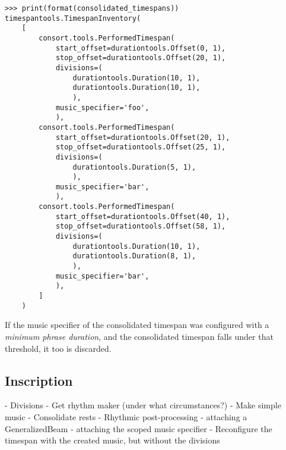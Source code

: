 \begin{abjadbookoutput}
\begin{singlespacing}
\vspace{-0.5\baselineskip}
\begin{lstlisting}
>>> print(format(consolidated_timespans))
timespantools.TimespanInventory(
    [
        consort.tools.PerformedTimespan(
            start_offset=durationtools.Offset(0, 1),
            stop_offset=durationtools.Offset(20, 1),
            divisions=(
                durationtools.Duration(10, 1),
                durationtools.Duration(10, 1),
                ),
            music_specifier='foo',
            ),
        consort.tools.PerformedTimespan(
            start_offset=durationtools.Offset(20, 1),
            stop_offset=durationtools.Offset(25, 1),
            divisions=(
                durationtools.Duration(5, 1),
                ),
            music_specifier='bar',
            ),
        consort.tools.PerformedTimespan(
            start_offset=durationtools.Offset(40, 1),
            stop_offset=durationtools.Offset(58, 1),
            divisions=(
                durationtools.Duration(10, 1),
                durationtools.Duration(8, 1),
                ),
            music_specifier='bar',
            ),
        ]
    )
\end{lstlisting}
\end{singlespacing}
\end{abjadbookoutput}

\noindent If the music specifier of the consolidated timespan was configured
with a \emph{minimum phrase duration}, and the consolidated timespan falls
under that threshold, it too is discarded.

\subsection{Inscription}
\label{ssec:inscription}

\begin{markdown}
-   Divisions
-   Get rhythm maker (under what circumstances?)
-   Make simple music
-   Consolidate rests
-   Rhythmic post-processing
    -   attaching a GeneralizedBeam
    -   attaching the scoped music specifier
-   Reconfigure the timespan with the created music, but without the divisions
\end{markdown}

\begin{comment}
<abjad>
parseable = r'''
\new Voice {
    {
        { \time 4/4 r4 c4 }
        { \times 2/3 { c4 r8 } r4 }
        { \time 4/4 r4 c4. r8 }
        { r4 \break }
        { \time 3/4 r4 }
        { c8 c4. }
        \times 2/3 { \time 2/4 r4 c4 c4 }
        { \time 4/4 c4. r8 }
        { r8 c4 r8 }
    }
}
'''
unconsolidated_staff = Staff(parseable, context_name='RhythmicStaff')
consort.annotate(unconsolidated_staff)
show(unconsolidated_staff)
</abjad>
\end{comment}

